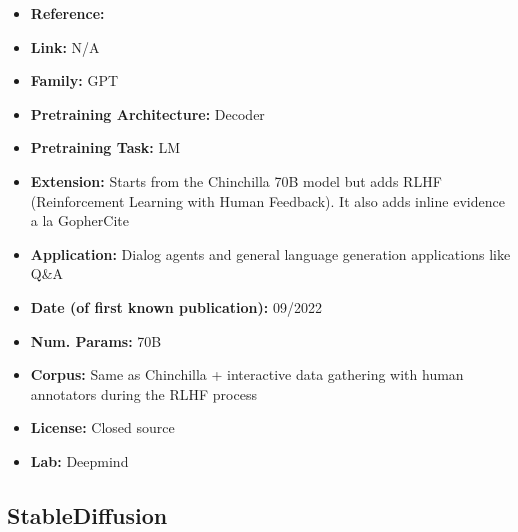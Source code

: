 \documentclass{article}
\begin{document}
            \begin{itemize}
                \item \textbf{Reference:} \href{https://arxiv.org/abs/2209.14375}{}
                \item \textbf{Link:} N/A
                \item \textbf{Family:} GPT 
                \item \textbf{Pretraining Architecture:} Decoder
                \item \textbf{Pretraining Task:} LM
                \item \textbf{Extension:} Starts from the Chinchilla 70B model but adds RLHF (Reinforcement Learning with Human Feedback). It also adds inline evidence a la GopherCite  
                \item \textbf{Application:} Dialog agents and general language generation applications like Q\&A
                \item \textbf{Date (of first known publication):} 09/2022
                \item \textbf{Num. Params:} 70B
                \item \textbf{Corpus:} Same as Chinchilla + interactive data gathering with human annotators during the RLHF process
                \item \textbf{License:} Closed source
                \item \textbf{Lab:} Deepmind
            \end{itemize}
 
\subsection{StableDiffusion}
\end{document}
